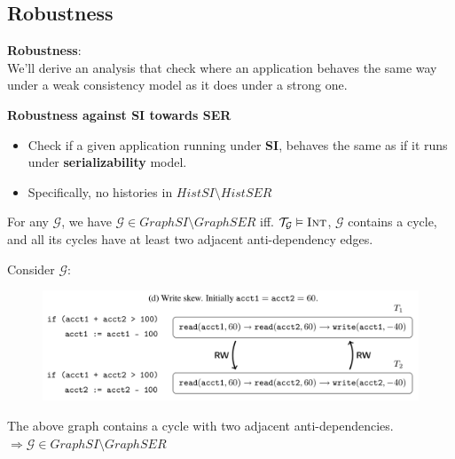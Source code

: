 \documentclass{beamer}
\begin{document}
\subsection{Robustness}

\begin{frame}
	\textbf{Robustness}: \\
	We'll derive an analysis that check where an application behaves the same way under a weak consistency model as it does under a strong one.
\end{frame}

\begin{frame}
	\textbf{Robustness against SI towards SER} \\
	\begin{itemize}
		\item Check if a given application running under \textbf{SI}, behaves the same as if it runs under \textbf{serializability} model.
		\item Specifically, no histories in $HistSI \setminus HistSER$
	\end{itemize}
\end{frame}

\begin{frame}
	\begin{theorem}
		For any $\mathcal{G}$, we have $\mathcal{G} \in GraphSI \setminus GraphSER $ iff. $\mathcal{T}_\mathcal{G} \vDash \textsc{Int}$, $\mathcal{G}$ contains a cycle, and all its cycles have at least two adjacent anti-dependency edges.
	\end{theorem}
\end{frame}

\begin{frame}
	Consider $\mathcal{G}$:
	\begin{figure}
		\includegraphics[scale=0.2]{fig2d}
	\end{figure}
	\begin{example}
		The above graph contains a cycle with two adjacent anti-dependencies. \\
		$\Rightarrow \mathcal{G} \in GraphSI \setminus GraphSER$
	\end{example}
\end{frame}
\end{document}

